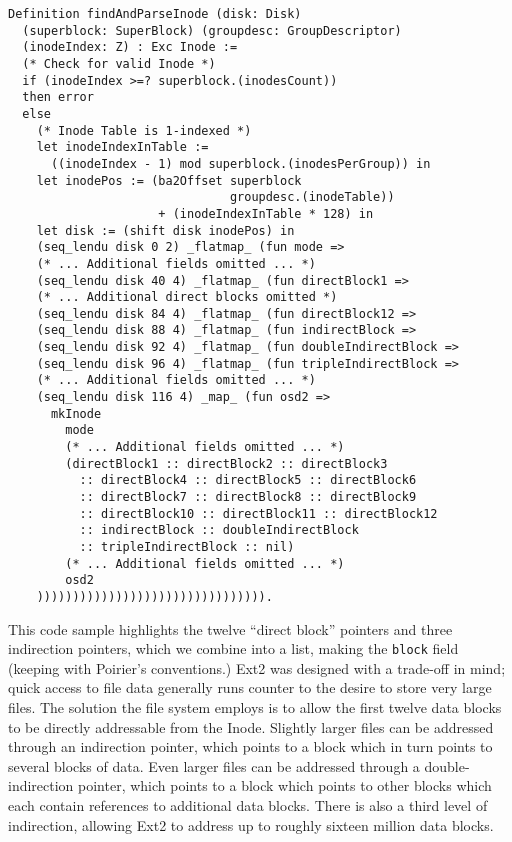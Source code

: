 \documentclass[nocopyrightspace]{sigplanconf}
\begin{document}
\begin{lstlisting}
Definition findAndParseInode (disk: Disk) 
  (superblock: SuperBlock) (groupdesc: GroupDescriptor)
  (inodeIndex: Z) : Exc Inode :=
  (* Check for valid Inode *)
  if (inodeIndex >=? superblock.(inodesCount))
  then error
  else
    (* Inode Table is 1-indexed *)
    let inodeIndexInTable := 
      ((inodeIndex - 1) mod superblock.(inodesPerGroup)) in
    let inodePos := (ba2Offset superblock
                               groupdesc.(inodeTable))
                     + (inodeIndexInTable * 128) in
    let disk := (shift disk inodePos) in
    (seq_lendu disk 0 2) _flatmap_ (fun mode =>
    (* ... Additional fields omitted ... *)
    (seq_lendu disk 40 4) _flatmap_ (fun directBlock1 =>
    (* ... Additional direct blocks omitted *)
    (seq_lendu disk 84 4) _flatmap_ (fun directBlock12 =>
    (seq_lendu disk 88 4) _flatmap_ (fun indirectBlock =>
    (seq_lendu disk 92 4) _flatmap_ (fun doubleIndirectBlock =>
    (seq_lendu disk 96 4) _flatmap_ (fun tripleIndirectBlock =>
    (* ... Additional fields omitted ... *)
    (seq_lendu disk 116 4) _map_ (fun osd2 =>
      mkInode
        mode
        (* ... Additional fields omitted ... *)
        (directBlock1 :: directBlock2 :: directBlock3
          :: directBlock4 :: directBlock5 :: directBlock6
          :: directBlock7 :: directBlock8 :: directBlock9
          :: directBlock10 :: directBlock11 :: directBlock12
          :: indirectBlock :: doubleIndirectBlock
          :: tripleIndirectBlock :: nil)
        (* ... Additional fields omitted ... *)
        osd2
    )))))))))))))))))))))))))))))))).
\end{lstlisting}

This code sample highlights the twelve ``direct block'' pointers and three
indirection pointers, which we combine into a list, making the {\tt block}
field (keeping with Poirier's conventions.) Ext2 was designed with a trade-off
in mind; quick access to file data generally runs counter to the desire to
store very large files.  The solution the file system employs is to allow the
first twelve data blocks to be directly addressable from the Inode. Slightly
larger files can be addressed through an indirection pointer, which points to
a block which in turn points to several blocks of data. Even larger files can
be addressed through a double-indirection pointer, which points to a block
which points to other blocks which each contain references to additional data
blocks. There is also a third level of indirection, allowing Ext2 to address
up to roughly sixteen million data blocks.
\end{document}
